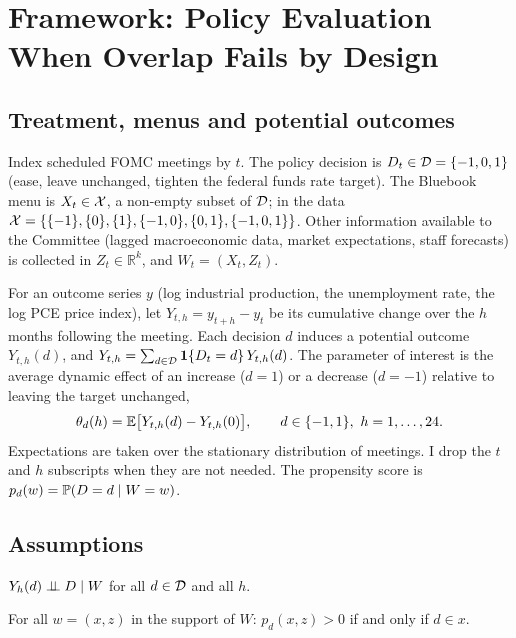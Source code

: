 \section{Framework: Policy Evaluation When Overlap Fails by Design}\label{sec:framework}

\subsection{Treatment, menus and potential outcomes}

Index scheduled FOMC meetings by $t$. The policy decision is $D_t\in\mathcal{D}=\{-1,0,1\}$ (ease, leave unchanged,
tighten the federal funds rate target). The Bluebook menu is $X_t\in\mathcal{X}$, a non-empty subset of $\mathcal{D}$; in the data
$\mathcal{X}=\{\{-1\},\{0\},\{1\},\{-1,0\},\{0,1\},\{-1,0,1\}\}$. Other information available to the Committee (lagged
macroeconomic data, market expectations, staff forecasts) is collected in $Z_t\in\mathbb{R}^k$, and
$W_t=(X_t,Z_t)$.

For an outcome series $y$ (log industrial production, the unemployment rate, the log PCE price index), let
$Y_{t,h}=y_{t+h}-y_t$ be its cumulative change over the $h$ months following the meeting. Each decision $d$
induces a potential outcome $Y_{t,h}(d)$, and $Y_{t,h}=\sum_{d\in\mathcal{D}}\mathbf{1}\{D_t=d\}\,Y_{t,h}(d)$. The parameter of
interest is the average dynamic effect of an increase ($d=1$) or a decrease ($d=-1$) relative to leaving the target
unchanged,
\begin{equation}\label{eq:theta}
  \theta_d(h)=\E\bigl[Y_{t,h}(d)-Y_{t,h}(0)\bigr],\qquad d\in\{-1,1\},\ h=1,\dots,24 .
\end{equation}
Expectations are taken over the stationary distribution of meetings. I drop the $t$ and $h$ subscripts when they
are not needed. The propensity score is $p_d(w)=\mathbb{P}(D=d\mid W=w)$.

\subsection{Assumptions}

\begin{assumption}\label{as:unconf}
$Y_{h}(d)\perp\!\!\!\perp D\mid W$ for all $d\in\mathcal{D}$ and all $h$.
\end{assumption}

\begin{assumption}\label{as:menu}
For all $w=(x,z)$ in the support of $W$: $p_d(x,z)>0$ if and only if $d\in x$.
\end{assumption}

